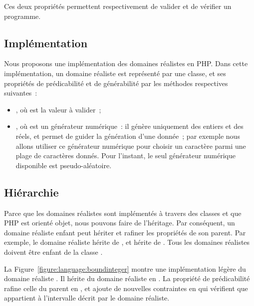 Ces deux propriétés permettent respectivement de {\strong valider} et de
{\strong vérifier} un programme.

\subsection{Implémentation}
\label{subsection:language:realdom:implementation}

Nous proposons une implémentation des domaines réalistes en PHP. Dans cette
implémentation, un domaine réaliste est représenté par une {\strong classe}, et
ses propriétés de prédicabilité et de générabilité par les {\strong méthodes}
respectives suivantes~:

\begin{itemize}

\item {}, où  est la valeur à valider~;

\item {}, où  est un {\strong générateur
numérique}~: il génère uniquement des entiers et des réels, et permet de guider
la génération d'une donnée~; par exemple nous allons utiliser ce générateur
numérique pour choisir un caractère parmi une plage de caractères donnés.  Pour
l'instant, le seul générateur numérique disponible est pseudo-aléatoire.

\end{itemize}

\subsection{Hiérarchie}
\label{subsection:language:realdom:hierarchy}

Parce que les domaines réalistes sont implémentés à travers des classes et que
PHP est orienté objet, nous pouvons faire de l'{\strong héritage}. Par
conséquent, un domaine réaliste enfant peut hériter et {\strong rafiner} les
propriétés de son parent. Par exemple, le domaine réaliste  hérite
de , et  hérite de . Tous les
domaines réalistes doivent être enfant de la classe .

La Figure~\ref{figure:language:boundinteger} montre une implémentation légère du
domaine réaliste . Il hérite du domaine réaliste
 en . La propriété de prédicabilité rafine celle du
parent en , et ajoute de nouvelles contraintes en  qui
vérifient que  appartient à l'intervalle décrit par le domaine
réaliste.

